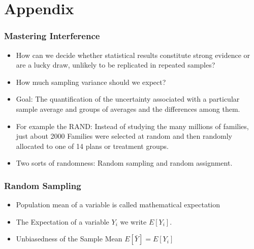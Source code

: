 \documentclass{beamer}
\begin{document}
\section{Appendix}
\begin{frame}
\frametitle{Mastering Interference}
\begin{itemize}
	\item How can we decide whether statistical results constitute strong evidence or are a lucky draw, unlikely to be replicated in repeated samples? 
	\item How much sampling variance should we expect?
	\item Goal: The quantification of the uncertainty associated
with a particular sample average and groups of averages and
the differences among them.
	\item For example the RAND: Instead of studying the
many millions of families, just about 2000 Families were selected at random and
then randomly allocated to one of 14 plans or treatment groups.
	\item Two sorts of randomness: Random sampling and random
assignment.
\end{itemize}

\end{frame}

\begin{frame}
\frametitle{Random Sampling}
\begin{itemize}
	\item Population mean of a variable is called mathematical expectation
	\item The Expectation of a variable $Y_i$ we write $E[Y_i]$.
	\item Unbiasedness of the Sample Mean $E[\bar{Y}] = E[Y_i]$
\end{itemize}

\end{frame}


\end{document}
